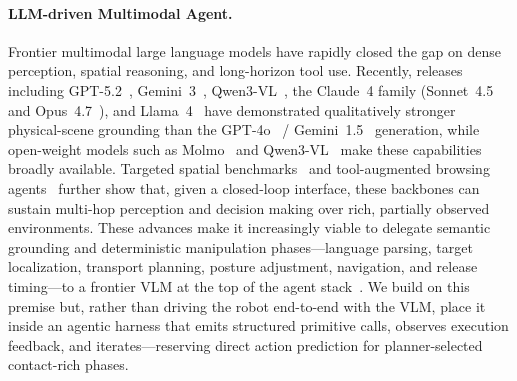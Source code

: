 \documentclass[11pt]{article}
\begin{document}
	\paragraph{LLM-driven Multimodal Agent.} Frontier multimodal large language models have rapidly closed the gap on dense perception, spatial reasoning, and long-horizon tool use. Recently, releases including GPT-5.2~\citep{openai2025gpt52}, Gemini~3~\citep{pichai2025gemini3}, Qwen3-VL~\citep{bai2025qwen3vltechnicalreport}, the Claude~4 family (Sonnet~4.5 and Opus~4.7~\citep{anthropic2025claudesonnet45}), and Llama~4~\citep{llama4} have demonstrated qualitatively stronger physical-scene grounding than the GPT-4o~\citep{openai2024gpt4ocard} / Gemini~1.5~\citep{team2023gemini} generation, while open-weight models such as Molmo~\citep{deitke2025molmo} and Qwen3-VL~\citep{bai2025qwen3vltechnicalreport} make these capabilities broadly available. Targeted spatial benchmarks~\citep{chen2024spatialvlm} and tool-augmented browsing agents~\citep{oaidr, geminidr, wu2025mmsearchr1, geng2025webwatcher, huang2026vision, jin2025search, li2025websailor} further show that, given a closed-loop interface, these backbones can sustain multi-hop perception and decision making over rich, partially observed environments. These advances make it increasingly viable to delegate semantic grounding and deterministic manipulation phases---language parsing, target localization, transport planning, posture adjustment, navigation, and release timing---to a frontier VLM at the top of the agent stack~\citep{team2025gemini, geminirobotics1d52025, wang2023voyager}. We build on this premise but, rather than driving the robot end-to-end with the VLM, place it inside an agentic harness that emits structured primitive calls, observes execution feedback, and iterates---reserving direct action prediction for planner-selected contact-rich phases.
\end{document}
